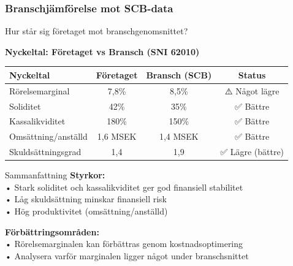 \documentclass[10pt]{beamer}
\begin{document}
\begin{frame}[label=bransch]
  \frametitle{Branschjämförelse mot SCB-data}
  \small
  Hur står sig företaget mot branschgenomsnittet?
  
  \vspace{0.5cm}
  \begin{center}
    \textbf{Nyckeltal: Företaget vs Bransch (SNI 62010)}\\
    \vspace{0.3cm}
    \begin{tabular}{l|c|c|c}
      \textbf{Nyckeltal} & \textbf{Företaget} & \textbf{Bransch (SCB)} & \textbf{Status} \\ \hline
      Rörelsemarginal & 7,8\% & 8,5\% & ⚠️ Något lägre \\
      Soliditet & 42\% & 35\% & ✅ Bättre \\
      Kassalikviditet & 180\% & 150\% & ✅ Bättre \\
      Omsättning/anställd & 1,6 MSEK & 1,4 MSEK & ✅ Bättre \\
      Skuldsättningsgrad & 1,4 & 1,9 & ✅ Lägre (bättre) \\
    \end{tabular}
  \end{center}
  
  \vspace{0.5cm}
  \begin{block}{Sammanfattning}
    \footnotesize
    \textbf{Styrkor:}\\
    • Stark soliditet och kassalikviditet ger god finansiell stabilitet\\
    • Låg skuldsättning minskar finansiell risk\\
    • Hög produktivitet (omsättning/anställd)
    
    \vspace{0.3cm}
    \textbf{Förbättringsområden:}\\
    • Rörelsemarginalen kan förbättras genom kostnadsoptimering\\
    • Analysera varför marginalen ligger något under branschsnittet
  \end{block}
  
  \vspace{0.5cm}
  \begin{flushright}
    \hyperlink{nextslide}{}
  \end{flushright}
\end{frame}

\end{document}
